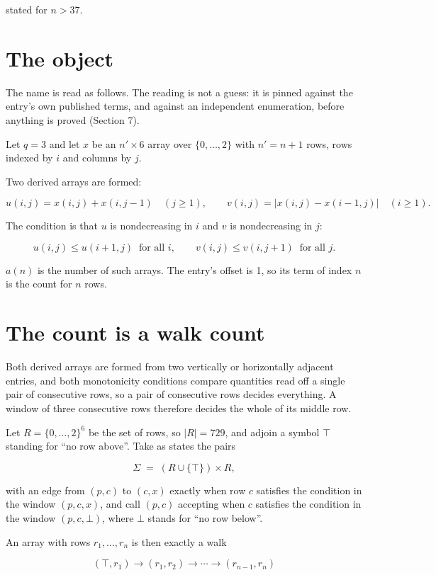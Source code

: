 \documentclass[11pt]{article}
\theoremstyle{definition}
\begin{document}
stated for $n > 37$.

\section{The object}

The name is read as follows. The reading is not a guess: it is pinned against the entry's own published terms, and against an independent enumeration, before anything is proved (Section 7).

Let $q = 3$ and let $x$ be an $n' \times 6$ array over $\{0,\dots,2\}$ with $n' = n + 1$ rows, rows indexed by $i$ and columns by $j$.

Two derived arrays are formed:

\[u(i,j) = x(i,j) + x(i,j{-}1)\quad (j \ge 1), \qquad v(i,j) = \lvert x(i,j) - x(i{-}1,j)\rvert\quad (i \ge 1).\]

The condition is that $u$ is nondecreasing in $i$ and $v$ is nondecreasing in $j$:

\[u(i,j) \le u(i{+}1,j) \ \text{ for all } i, \qquad v(i,j) \le v(i,j{+}1) \ \text{ for all } j.\]

$a(n)$ is the number of such arrays. The entry's offset is 1, so its term of index $n$ is the count for $n$ rows.

\section{The count is a walk count}

Both derived arrays are formed from two vertically or horizontally adjacent entries, and both monotonicity conditions compare quantities read off a single pair of consecutive rows, so a pair of consecutive rows decides everything. A window of three consecutive rows therefore decides the whole of its middle row.

Let $R = \{0,\dots,2\}^{6}$ be the set of rows, so $|R| = 729$, and adjoin a symbol $\top$ standing for ``no row above''. Take as states the pairs

\[\Sigma \;=\; (R \cup \{\top\}) \times R,\]

with an edge from $(p,c)$ to $(c,x)$ exactly when row $c$ satisfies the condition in the window $(p,c,x)$, and call $(p,c)$ accepting when $c$ satisfies the condition in the window $(p,c,\bot)$, where $\bot$ stands for ``no row below''.

An array with rows $r_1,\dots,r_n$ is then exactly a walk

\[(\top,r_1) \to (r_1,r_2) \to \cdots \to (r_{n-1},r_n)\]
\end{document}
